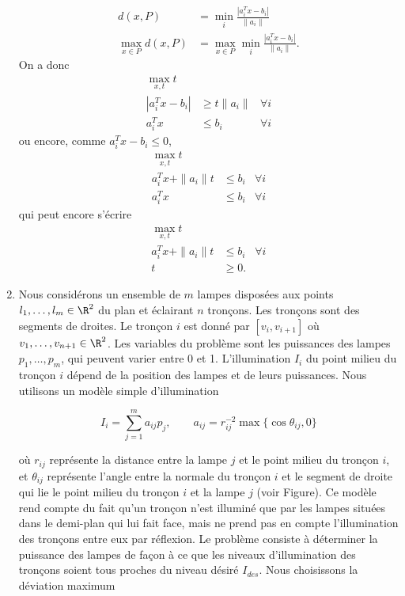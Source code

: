 \begin{enumerate}
    \label{ex:cheby_center}
    \begin{solution}
      \begin{align*}
        d(x, P) & = \min_i \frac{|a_i^Tx - b_i|}{\|a_i\|}\\
        \max_{x\in P} d(x, P)
        & = \max_{x\in P}\min_i \frac{|a_i^Tx - b_i|}{\|a_i\|}.
      \end{align*}
      On a donc
      \begin{align*}
        \max_{x, t} t\\
        |a_i^Tx - b_i| & \geq t\|a_i\| & \forall i\\
        a_i^Tx & \leq b_i & \forall i
      \end{align*}
      ou encore, comme $a_i^Tx - b_i \leq 0$,
      \begin{align*}
        \max_{x, t} t\\
        a_i^Tx + \|a_i\|t & \leq b_i & \forall i\\
        a_i^Tx & \leq b_i & \forall i
      \end{align*}
      qui peut encore s'écrire
      \begin{align*}
        \max_{x, t} t\\
        a_i^Tx + \|a_i\|t & \leq b_i & \forall i\\
        t & \geq 0.
      \end{align*}
    \end{solution}


  \item Nous considérons un ensemble de $m$ lampes disposées aux points $l_1, \ldots, l_m \in \R^2$ du plan et éclairant $n$
    tronçons. Les tronçons sont des segments de droites. Le tronçon $i$ est donné par $[v_i, v_{i+1}]$ où $v_1, \ldots, v_{n+1}
    \in \R^2$.  Les variables du problème sont les puissances des lampes $p_1, \ldots, p_m$, qui peuvent varier entre 0 et 1.
    L'illumination $I_i$ du point milieu du tronçon $i$ dépend de la position des lampes et de leurs
    puissances. Nous utilisons un modèle simple d'illumination

    \[I_i = \sum_{j=1}^m a_{ij} p_j, \qquad a_{ij}=r_{ij}^{-2} \max \{\cos \theta_{ij}, 0 \}\]

    où $r_{ij}$ représente la distance entre la lampe $j$ et le point milieu du tronçon $i$, et $\theta_{ij}$ représente l'angle
    entre la normale du tronçon $i$ et le segment de droite qui lie le point milieu du tronçon $i$ et la lampe $j$ (voir Figure). Ce
    modèle rend compte du fait qu'un tronçon n'est illuminé que par les lampes situées dans le demi-plan qui lui fait face,
    mais ne prend pas en compte l'illumination des tronçons entre eux par réflexion.  Le problème consiste à déterminer la puissance des lampes de façon à ce
    que les niveaux d'illumination des  tronçons soient tous proches du niveau désiré $I_{des}$. Nous choisissons la déviation maximum


\end{enumerate}
